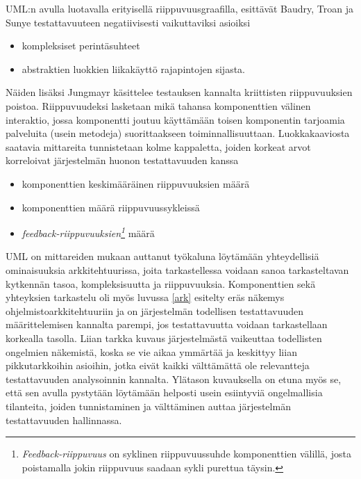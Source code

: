 \documentclass[finnish]{tktltiki2}
\numberwithin{table}{section}
\theoremstyle{definition}
\theoremstyle{remark}
\begin{document}

UML:n avulla luotavalla erityisellä riippuvuusgraafilla, esittävät Baudry, Troan ja Sunye testattavuuteen negatiivisesti vaikuttaviksi asioiksi \citep{baudry_testability_2002}

\begin{itemize} 
	\item kompleksiset perintäsuhteet
	\item abstraktien luokkien liikakäyttö rajapintojen sijasta.
\end{itemize}


Näiden lisäksi Jungmayr käsittelee testauksen kannalta kriittisten riippuvuuksien poistoa. Riippuvuudeksi lasketaan mikä tahansa komponenttien välinen interaktio, jossa komponentti joutuu käyttämään toisen komponentin tarjoamia palveluita (usein metodeja) suorittaakseen toiminnallisuuttaan.  Luokkakaaviosta saatavia mittareita tunnistetaan kolme kappaletta, joiden korkeat arvot korreloivat järjestelmän huonon testattavuuden kanssa \citep{Jungmayr:2002} 

\begin{itemize}
	\item komponenttien keskimääräinen riippuvuuksien määrä
	\item komponenttien määrä riippuvuussykleissä
	\item \textit{feedback-riippuvuuksien\footnote{\textit{Feedback-riippuvuus} on syklinen riippuvuussuhde komponenttien välillä, josta poistamalla jokin riippuvuus saadaan sykli purettua täysin.}}  määrä 
\end{itemize}

UML on mittareiden mukaan auttanut työkaluna löytämään yhteydellisiä ominaisuuksia arkkitehtuurissa, joita tarkastellessa voidaan sanoa tarkasteltavan  kytkennän tasoa, kompleksisuutta ja riippuvuuksia. Komponenttien sekä yhteyksien tarkastelu oli myös luvussa \ref{ark} esitelty eräs näkemys ohjelmistoarkkitehtuuriin ja on järjestelmän todellisen testattavuuden määrittelemisen kannalta parempi, jos testattavuutta voidaan tarkastellaan korkealla tasolla. Liian tarkka kuvaus järjestelmästä vaikeuttaa todellisten ongelmien näkemistä, koska se vie aikaa ymmärtää ja keskittyy liian pikkutarkkoihin asioihin, jotka eivät kaikki välttämättä ole relevantteja testattavuuden analysoinnin kannalta. Ylätason kuvauksella on etuna myös se, että sen avulla pystytään löytämään helposti usein esiintyviä ongelmallisia tilanteita, joiden tunnistaminen ja välttäminen auttaa järjestelmän testattavuuden hallinnassa.
\end{document}
